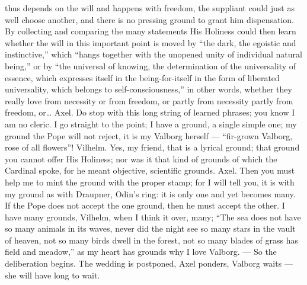 \documentclass[12pt,a4paper,openany]{book}
\newcommand{\opage}[1]{\marginnote{\footnotesize\textit{[#1]}}}
\begin{document}
thus depends on the will and happens with freedom,
the suppliant could just as well choose another, and there
is no pressing ground to grant him dispensation.
By collecting and comparing the many statements
His Holiness could then learn whether the will in this important point
is moved by ``the dark, the egoistic and instinctive,''
which ``hangs together with the unopened unity of
individual natural being,'' or by ``the universal of knowing, the determination
of the universality of essence, which expresses itself in the
being-for-itself in the form of liberated universality, which
belongs to self-consciousness,'' in other words, whether they really love
from necessity or from freedom, or partly from necessity
partly from freedom, or\dots{} Axel. Do
stop with this long string of learned phrases; you
know I am no cleric. I go straight to the point;
I have a ground, a single simple one; my ground
the Pope will not reject, it is my Valborg herself ---
``fir-grown Valborg, rose of all flowers''! Vilhelm.
Yes, my friend, that is a lyrical ground; that ground you
cannot offer His Holiness; nor was it that kind of
grounds of which the Cardinal spoke, for he meant
objective, scientific grounds. Axel. Then you must
help me to mint the ground with the proper stamp; for
I will tell you, it is with my ground as with Draupner,
Odin's ring: it is only one and yet becomes many.
If the Pope does not accept the one ground, then he must
accept the other. I have many grounds, Vilhelm,
when I think it over, many; ``The sea does not have so many
animals in its waves, never did the night see so many stars
in the vault of heaven, not so many birds dwell
\setcounter{footnote}{0}%
\opage{589}in the forest, not so many blades of grass has field and
meadow,'' as my heart has grounds why I love Valborg.
--- So the deliberation begins. The wedding is postponed, Axel
ponders, Valborg waits --- she will have long to wait.
\end{document}
